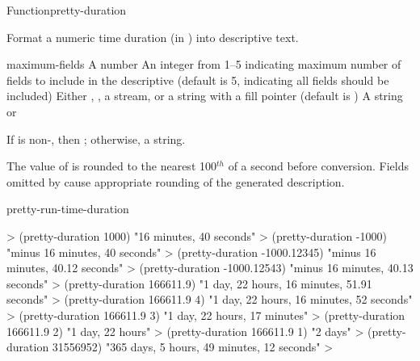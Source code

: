 \documentclass[10pt,twoside,english,pdftex]{article}
\begin{document}
\begin{functiondoc}{Function}{pretty-duration}{%
      
    \returns{} }
% 

\fnsyntax

\fnpurpose Format a numeric time duration (in ) into
descriptive text.

\fnpackage {}

\fnmodule {}

\fnargs
\begin{args}{maximum-fields}
\arg[seconds] A number
 An integer from 1--5 indicating maximum number of fields 
to include in the descriptive  (default is 5, indicating all 
fields should be included)
\arg[destination] Either \nil, , a stream, or a string with a fill 
pointer (default is \nil)
\arg[result] A string or \nil{}
\end{args}

\fnreturns If  is non-\nil, then \nil; otherwise, a string.

\fndescription The value of  is rounded to the nearest
100$^{th}$ of a second before conversion.  Fields omitted by
 cause appropriate rounding of the generated
description.

\begin{alsos}{pretty-run-time-duration}
\end{alsos}

\fnexamples
%
\W\supp
\begin{example}
  > (pretty-duration 1000)
  "16 minutes, 40 seconds"
  > (pretty-duration -1000)
  "minus 16 minutes, 40 seconds"
  > (pretty-duration -1000.12345)
  "minus 16 minutes, 40.12 seconds"
  > (pretty-duration -1000.12543)
  "minus 16 minutes, 40.13 seconds"\goodpagebreak
  > (pretty-duration 166611.9)
  "1 day, 22 hours, 16 minutes, 51.91 seconds"
  > (pretty-duration 166611.9 4)
  "1 day, 22 hours, 16 minutes, 52 seconds"
  > (pretty-duration 166611.9 3)
  "1 day, 22 hours, 17 minutes"
  > (pretty-duration 166611.9 2)
  "1 day, 22 hours"
  > (pretty-duration 166611.9 1)
  "2 days"\goodpagebreak
  > (pretty-duration 31556952)
  "365 days, 5 hours, 49 minutes, 12 seconds"
  >
\end{example}

\end{functiondoc}
\end{document}
